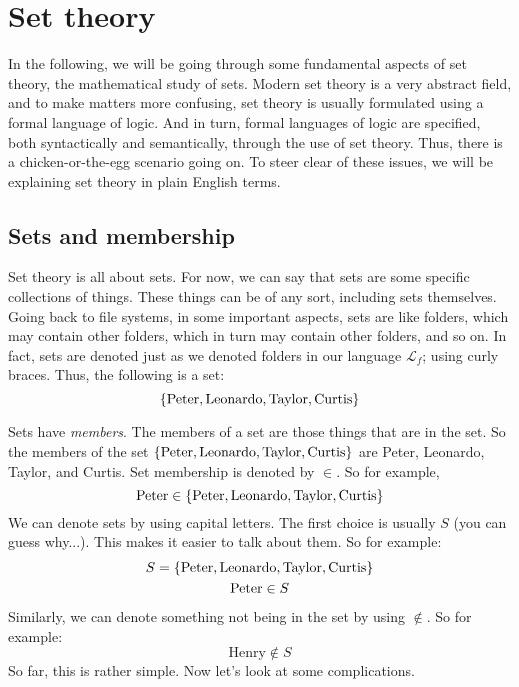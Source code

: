 \chapter{Set theory}

In the following, we will be going through some fundamental aspects of set theory, the mathematical study of sets. Modern set theory is a very abstract field, and to make matters more confusing, set theory is usually formulated using a formal language of logic. And in turn, formal languages of logic are specified, both syntactically and semantically, through the use of set theory. Thus, there is a chicken-or-the-egg scenario going on. To steer clear of these issues, we will be explaining set theory in plain English terms. 

\section{Sets and membership}

Set theory is all about sets. For now, we can say that sets are some specific collections of things. These things can be of any sort, including sets themselves. Going back to file systems, in some important aspects, sets are like folders, which may contain other folders, which in turn may contain other folders, and so on. In fact, sets are denoted just as we denoted folders in our language $\mathcal{L}_f$; using curly braces. Thus, the following is a set:
\[
\{\text{Peter}, \text{Leonardo}, \text{Taylor}, \text{Curtis}\}
\]

Sets have \textit{members}. The members of a set are those things that are in the set. So the members of the set $\{\text{Peter}, \text{Leonardo}, \text{Taylor}, \text{Curtis}\}$ are Peter, Leonardo, Taylor, and Curtis. Set membership is denoted by $\in$. So for example, 
\[
\text{Peter} \in \{\text{Peter}, \text{Leonardo}, \text{Taylor}, \text{Curtis}\}
\]
We can denote sets by using capital letters. The first choice is usually $S$ (you can guess why...). This makes it easier to talk about them. So for example:
\begin{gather*}
	S=\{\text{Peter}, \text{Leonardo}, \text{Taylor}, \text{Curtis}\}\\
	\text{Peter} \in S
\end{gather*}
Similarly, we can denote something not being in the set by using $\notin$. So for example:
\[
\text{Henry} \notin S
\]
So far, this is rather simple. Now let's look at some complications. 

